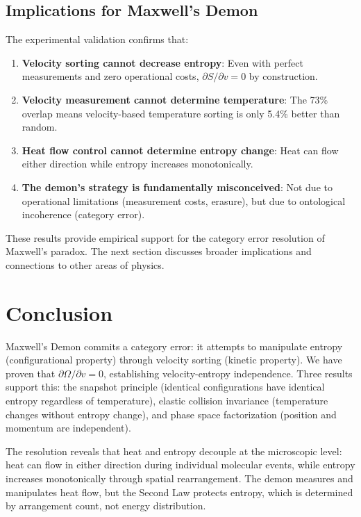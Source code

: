 \documentclass[10pt,twocolumn,letterpaper]{article}
\theoremstyle{definition}
\theoremstyle{remark}
\newcommand{\Om}{\Omega}
\begin{document}
\subsection{Implications for Maxwell's Demon}

The experimental validation confirms that:

\begin{enumerate}
\item \textbf{Velocity sorting cannot decrease entropy}: Even with perfect measurements and zero operational costs, $\partial S/\partial v = 0$ by construction.

\item \textbf{Velocity measurement cannot determine temperature}: The 73\% overlap means velocity-based temperature sorting is only 5.4\% better than random.

\item \textbf{Heat flow control cannot determine entropy change}: Heat can flow either direction while entropy increases monotonically.

\item \textbf{The demon's strategy is fundamentally misconceived}: Not due to operational limitations (measurement costs, erasure), but due to ontological incoherence (category error).
\end{enumerate}

These results provide empirical support for the category error resolution of Maxwell's paradox. The next section discusses broader implications and connections to other areas of physics.

\section{Conclusion}

Maxwell's Demon commits a category error: it attempts to manipulate entropy (configurational property) through velocity sorting (kinetic property). We have proven that $\partial \Om/\partial v = 0$, establishing velocity-entropy independence. Three results support this: the snapshot principle (identical configurations have identical entropy regardless of temperature), elastic collision invariance (temperature changes without entropy change), and phase space factorization (position and momentum are independent).

The resolution reveals that heat and entropy decouple at the microscopic level: heat can flow in either direction during individual molecular events, while entropy increases monotonically through spatial rearrangement. The demon measures and manipulates heat flow, but the Second Law protects entropy, which is determined by arrangement count, not energy distribution.
\end{document}
